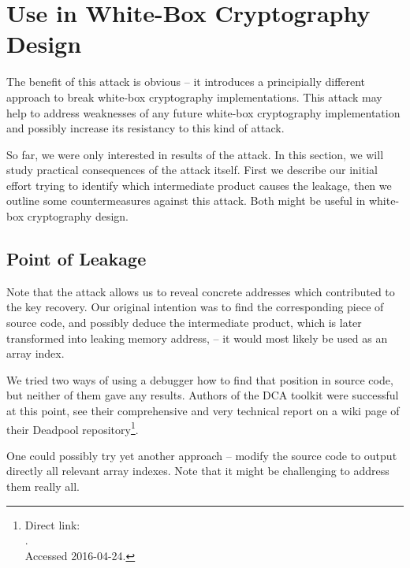\section{Use in White-Box Cryptography Design}
\label{sec:useindesign}

The benefit of this attack is obvious -- it introduces a principially different approach to break white-box cryptography implementations. This attack may help to address weaknesses of any future white-box cryptography implementation and possibly increase its resistancy to this kind of attack.

So far, we were only interested in results of the attack. In this section, we will study practical consequences of the attack itself. First we describe our initial effort trying to identify which intermediate product causes the leakage, then we outline some countermeasures against this attack. Both might be useful in white-box cryptography design.



\subsection{Point of Leakage}
\label{sec:leakpoint}

Note that the attack allows us to reveal concrete addresses which contributed to the key recovery. Our original intention was to find the corresponding piece of source code, and possibly deduce the intermediate product, which is later transformed into leaking memory address, -- it would most likely be used as an array index.

We tried two ways of using a debugger how to find that position in source code, but neither of them gave any results. Authors of the DCA toolkit \cite{bos2016tools} were successful at this point, see their comprehensive and very technical report on a wiki page of their Deadpool repository\footnote{Direct link:\\.\\Accessed 2016-04-24.}.

One could possibly try yet another approach -- modify the source code to output directly all relevant array indexes. Note that it might be challenging to address them really all.


